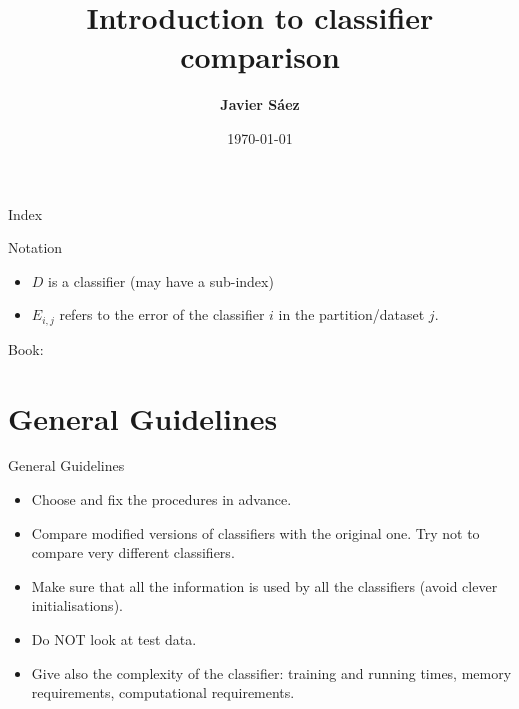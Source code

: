 \documentclass{beamer}
\begin{document}
\title[Introduction to classifier comparison]{Introduction to classifier comparison }
\author[Javier Sáez]{\textbf {Javier Sáez}} %
\date{\today}

\begin{frame}
    \maketitle
\end{frame}

\begin{frame}{Index}
    \tableofcontents
\end{frame}


\begin{frame}{Notation}
\begin{itemize}
    \item \(D\) is a classifier (may have a sub-index)
    \item \(E_{i,j}\) refers to the error of the classifier \(i\) in the partition/dataset \(j\).
\end{itemize}

\vspace{1cm}
Book: 
    \cite{10.5555/2935490}
\end{frame}

\section{General Guidelines}

\begin{frame}{General Guidelines}

\begin{itemize}
    \item Choose and fix the procedures in advance.
    \pause
    \item Compare modified versions of classifiers with the original one. Try not to compare very different classifiers.
    \pause
    \item Make sure that all the information is used by all the classifiers (avoid clever initialisations).
    \pause
    \item Do NOT look at test data.
    \pause
    \item Give also the complexity of the classifier: training and running times, memory requirements, computational requirements.
\end{itemize}
    
\end{frame}
\end{document}
